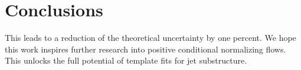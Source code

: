 \section{Conclusions}\label{sec:conclusions}

This leads to a reduction of the theoretical uncertainty by one percent.
We hope this work inspires further research into positive conditional
normalizing flows. This unlocks the full potential of template fits for
jet substructure.


